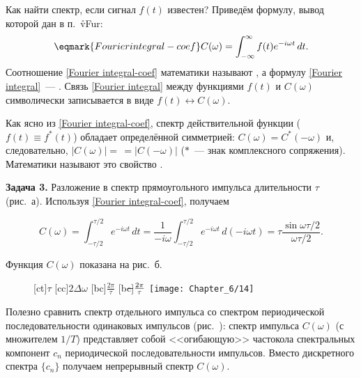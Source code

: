 Как найти спектр, если сигнал $f(t)$ известен? Приведём формулу, вывод которой
дан в п.~\r{vFur}:
\begin{equation}
    \eqmark{Fourier integral-coef}
    C(\omega)=\int_{-\infty}^\infty f(t)e^{-i\omega t}\,dt.
\end{equation}
Соотношение \eqref{Fourier integral-coef} математики называют , а формулу \eqref{Fourier integral}~---
. Связь \eqref{Fourier integral} между функциями $f(t)$ и
$C(\omega)$ символически записывается в виде
$f(t)\leftrightarrow C(\omega)$.

Как ясно из \eqref{Fourier integral-coef}, спектр действительной функции
($f(t)\equiv f^*(t)$) обладает определённой симметрией:
$C(\omega)=C^*(-\omega)$ и, следовательно, $|C(\omega)|=\,=|C(-\omega)|$
($*$~--- знак комплексного сопряжения). Математики называют это
свойство .

\textbf{Задача 3.} Разложение в спектр прямоугольного импульса длительности
$\tau$ (рис.~а). Используя \eqref{Fourier
integral-coef}, получаем

\begin{equation*}
    C(\omega)=\int_{-\tau/2}^{\tau/2} e^{-i\omega
t}\,dt=\frac{1}{-i\omega}\int_{-\tau/2}^{\tau/2} e^{-i\omega t}\,
d(-i\omega t)=\tau\frac{\sin\omega\tau/2}{\omega\tau/2}.
\end{equation*}

Функция $C(\omega)$ показана на рис.~б.
\begin{figure}[h!]
    [ct]{$\tau$}
    [cc]{$2\Delta\omega$}
    [bc]{$\frac{2\pi}{\tau}$}
    [bc]{$\llap{$-$}\frac{2\pi}{\tau}$}
    \texttt{[image: Chapter\_6/14]}
    \caption{}
\end{figure}

Полезно сравнить спектр отдельного импульса со спектром периодической
последовательности одинаковых импульсов (рис.~):
спектр импульса $C(\omega)$ (с множителем $1/T$) представляет собой
<<огибающую>> частокола спектральных компонент $c_n$
периодической последовательности импульсов. Вместо дискретного спектра $\{c_n\}$
получаем непрерывный спектр $C(\omega)$.

